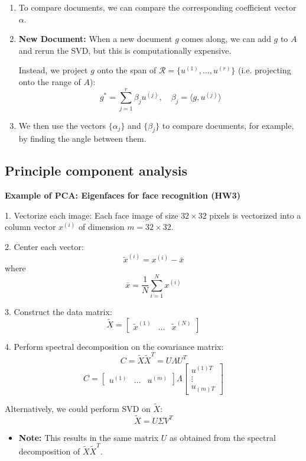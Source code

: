 \begin{intuition}
\begin{enumerate}
        \item To compare documents, we can compare the corresponding coefficient vector \( \alpha \).
    
        \item \textbf{New Document:} When a new document \( g \) comes along, we can add \( g \) to \( A \) and rerun the SVD, but this is computationally expensive.
    
        Instead, we project \( g \) onto the span of \( \mathcal{R} = \{ u^{(1)}, \ldots, u^{(r)} \} \) (i.e. projecting onto the range of \( A \)):
        \[
        g^* = \sum_{j=1}^{r} \beta_j u^{(j)}, \quad \beta_j = \langle g, u^{(j)} \rangle
        \]
    
        \item We then use the vectors \( \{ \alpha_j \} \) and \( \{ \beta_j \} \) to compare documents, for example, by finding the angle between them.
    \end{enumerate}

\end{intuition}

\subsection{Principle component analysis}
\begin{example}
    \textbf{Example of PCA: Eigenfaces for face recognition (HW3)}

1. Vectorize each image: Each face image of size \( 32 \times 32 \) pixels is vectorized into a column vector \( x^{(i)} \) of dimension \( m = 32 \times 32 \).

2. Center each vector: 
   \[
   \tilde{x}^{(i)} = x^{(i)} - \bar{x}
   \]
   where 
   \[
   \bar{x} = \frac{1}{N} \sum_{i=1}^{N} x^{(i)}
   \]

3. Construct the data matrix:
   \[
   \tilde{X} = \begin{bmatrix} \tilde{x}^{(1)} & \ldots & \tilde{x}^{(N)} \end{bmatrix}
   \]

4. Perform spectral decomposition on the covariance matrix:
   \[
   C = \tilde{X} \tilde{X}^T = U \Lambda U^T
   \]
   \[
    C= 
    \begin{bmatrix}
    u^{(1)} & \ldots & u^{(m)}
    \end{bmatrix}
    \Lambda
    \begin{bmatrix}
    u^{(1)T} \\
    \vdots \\
    u_{(m)T}
    \end{bmatrix}
    \]

Alternatively, we could perform SVD on \( \tilde{X} \):
\[
\tilde{X} = U \Sigma V^T
\]
\begin{itemize}
    \item \textbf{Note:} This results in the same matrix \( U \) as obtained from the spectral decomposition of \( \tilde{X} \tilde{X}^T \).
\end{itemize}
\end{example}

